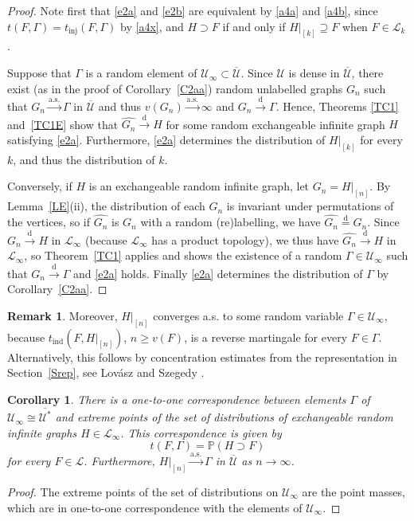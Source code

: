 \documentclass[11pt,reqno,tbtags]{amsart}
\numberwithin{equation}{section}
\newtheorem{corollary}[theorem]{Corollary}
\theoremstyle{definition}
\newtheorem{remark}{Remark}[section]
\theoremstyle{remark}
\newcommand{\refT}[1]{Theorem~\ref{#1}}
\newcommand{\refC}[1]{Corollary~\ref{#1}}
\newcommand{\refL}[1]{Lemma~\ref{#1}}
\newcommand{\refS}[1]{Section~\ref{#1}}
\newcommand{\refand}[2]{\ref{#1} and~\ref{#2}}
\newcommand\ntoo{\ensuremath{{n\to\infty}}}
\newcommand{\as}{a.s.\spacefactor=1000}
\newcommand{\tend}{\longrightarrow}
\newcommand\dto{\overset{\mathrm{d}}{\tend}}
\newcommand\asto{\overset{\mathrm{a.s.}}{\tend}}
\newcommand\eqd{\overset{\mathrm{d}}{=}}
\renewcommand\P{\operatorname{\mathbb P{}}}
\newcommand\gG{\Gamma}
\newcommand\cL{{\mathcal L}}
\newcommand\cU{{\mathcal U}}
\renewcommand{\=}{:=}
\newcommand{\Lovaszetal}{Lov\'asz and Szegedy}
\newcommand{\tinj}{t_{\mathrm{inj}}}
\newcommand{\tind}{t_{\mathrm{ind}}}
\newcommand{\cux}{\cU^*}
\newcommand{\cuxq}{\overline{\cux}}
\newcommand{\cuq}{\overline{\cU}}
\newcommand{\cuoo}{\cU_\infty}
\newcommand{\cloo}{\cL_\infty}
\newcommand\hgn{\widehat {G_n}}
\newcommand{\rest}[1]{|_{[#1]}}
\newcommand{\exch}{exchangeable}
\begin{document}
\begin{proof}
Note first that \eqref{e2a} and \eqref{e2b} are equivalent by
\eqref{a4a} and \eqref{a4b}, since $t(F,\gG)=\tinj(F,\gG)$ by \eqref{a4x},
and $H\supset F$ if and only if $H\rest k\supseteq F$ when $F\in\cL_k$.

Suppose that $\gG$ is a random element of
  $\cuoo\subset\cuq$. Since $\cU$ is dense in $\cuq$, there exist (as
  in the proof of \refC{C2aa})
  random unlabelled graphs $G_n$ such that $G_n\asto \gG$ in $\cuq$ and
  thus $v(G_n)\asto\infty$ and $G_n\dto \gG$.
Hence, Theorems \refand{TC1}{TC1E} 
show that $\hgn\dto H$ for some random \exch{} infinite graph $H$
  satisfying \eqref{e2a}.
Furthermore, \eqref{e2a} determines the distribution of $H\rest k$ for
  every $k$, and thus the distribution of $k$.

Conversely, if $H$ is an \exch{} random infinite graph, let
$G_n=H\rest n$. By \refL{LE}(ii), the distribution of each $G_n$ is
invariant under permutations of the vertices, so if $\hgn$ is $G_n$
with a random (re)labelling, we have $\hgn\eqd G_n$.
Since $G_n\dto H$ in $\cloo$ (because $\cloo$ has a product topology),
we thus have $\hgn\dto H$ in $\cloo$, so \refT{TC1} applies and shows
the existence of a random $\gG\in\cuoo$ such that 
$G_n\dto \gG$ and 
\eqref{e2a} holds. 
Finally \eqref{e2a} determines the distribution of $\gG$ 
by \refC{C2aa}.
\end{proof}

\begin{remark}\label{Ras}
  Moreover, $H\rest n$ converges \as{} to some random variable $\gG\in\cuoo$, 
because $\tind(F,H\rest n)$, $n\ge v(F)$, 
is a reverse martingale for every $F\in \gG$. 
Alternatively, this follows by concentration estimates from the
representation in \refS{Srep}, see
\Lovaszetal{} \cite[Theorem 2.5]{LSz}.
\end{remark}

\begin{corollary}\label{CE}
There is a one-to-one correspondence between 
elements $\gG$ of $\cuoo\cong\cuxq$ and extreme points of the set of
distributions of \exch{} random infinite graphs
$H\in\cloo$.
This correspondence is given by 
\begin{equation}\label{ce}
t(F,\gG)=\P(H\supset F)
\end{equation}
for every $F\in\cL$. Furthermore, $H\rest n\asto \gG$ in $\cuq$ as \ntoo.
\end{corollary}
\begin{proof}
  The extreme points of the set of distributions on $\cuoo$ are the
  point masses, which are in one-to-one correspondence with the
  elements of $\cuoo$.
\end{proof}
\end{document}
